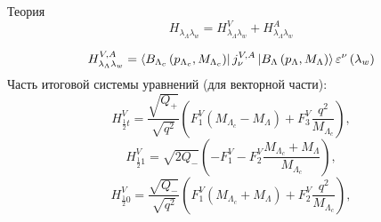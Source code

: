 \documentclass{beamer}
\newcommand{\inrad}[1]{\left( #1 \right)}
\newcommand{\inner}[1]{\left( #1 \right)}
\newcommand{\eps}{\varepsilon}
\begin{document}
\begin{frame}{Теория}
    \begin{equation*}
        H_{\lambda_\Lambda \lambda_w} = H^V_{\lambda_\Lambda \lambda_w} 
        + H^A_{\lambda_\Lambda \lambda_w} 
    \end{equation*}
     
    \begin{equation*}
        H^{V,A}_{\lambda_\Lambda \lambda_w} = 
        \bra{B_{\Lambda_c} \inner{p_{\Lambda_c}, M_{\Lambda_c}}}
        j_\nu^{V,A}
        \ket{B_{\Lambda} \inner{p_{\Lambda}, M_{\Lambda}}} 
        \eps^\nu \inner{\lambda_w}
        \label{eq:helisity}
    \end{equation*}
    Часть итоговой системы уравнений (для векторной части):
    \begin{equation*}
    H^{V}_{\frac{1}{2}t} = \frac{\sqrt{Q_+}}{\sqrt{q^2}} \inrad{ F_1^V \inrad{ M_{\Lambda_c} - M_{\Lambda} } + F_3^V \frac{q^2}{M_{\Lambda_c}} },
    \end{equation*}
    \begin{equation*}
    H^{V}_{\frac{1}{2}1} = \sqrt{2Q_-} \inrad{ - F_1^V - F_2^V \frac{M_{\Lambda_c} + M_{\Lambda}}{M_{\Lambda_c}} },
    \end{equation*}
    \begin{equation*}
    H^{V}_{\frac{1}{2}0} = \frac{\sqrt{Q_-}}{\sqrt{q^2}} \inrad{ F_1^V \inrad{ M_{\Lambda_c} + M_{\Lambda} } + F_2^V \frac{q^2}{M_{\Lambda_c}} },
    \end{equation*}
\end{frame}
\end{document}
